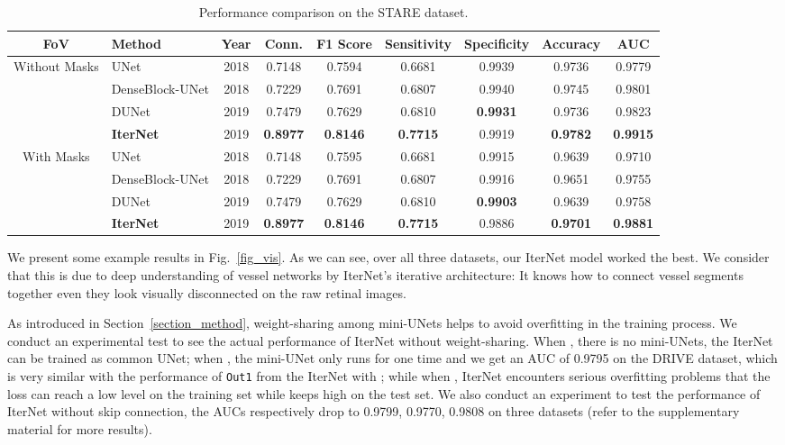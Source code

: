 \documentclass[10pt,twocolumn,letterpaper]{article}
\begin{document}
\begin{table*}[!t]
	\caption{Performance comparison on the STARE dataset.}
	\label{table_detect_performance_stare}
	\centering
	\begin{tabular}{cl|c|cccccc}
		\hline
		FoV &Method & Year & Conn. & F1 Score & Sensitivity & Specificity & Accuracy & AUC\\ 
		\hline					
		
		\multirow{4}{*}{Without Masks} &UNet  & 2018& 0.7148 &0.7594&   0.6681& 0.9939 & 0.9736 & 0.9779\\
		&DenseBlock-UNet& 2018& 0.7229 & 0.7691 &0.6807& 0.9940& 0.9745 &0.9801\\
		&DUNet &2019& 0.7479 &0.7629&  0.6810 & \textbf{0.9931} &  0.9736& 0.9823\\
		&\textbf{IterNet} & 2019&\textbf{0.8977}&  \textbf{0.8146} &  \textbf{0.7715} & 0.9919 & \textbf{0.9782}& \textbf{0.9915}\\
		
		\hline
		
		\multirow{4}{*}{With Masks}&UNet & 2018& 0.7148 &0.7595&   0.6681& 0.9915 & 0.9639 & 0.9710\\		
		&DenseBlock-UNet& 2018& 0.7229 & 0.7691 &0.6807& 0.9916& 0.9651 &0.9755\\
		&DUNet &2019& 0.7479 &0.7629&  0.6810 & \textbf{0.9903} &  0.9639& 0.9758\\		
		&\textbf{IterNet} & 2019&\textbf{0.8977}&  \textbf{0.8146} &  \textbf{0.7715} & 0.9886 & \textbf{0.9701}& \textbf{0.9881}\\
		\hline
	\end{tabular}
\end{table*}


We present some example results in Fig.~\ref{fig_vis}. As we can see, over all three datasets, our IterNet model worked the best. We consider that this is due to deep understanding of vessel networks by IterNet's iterative architecture: It knows how to connect vessel segments together even they look visually disconnected on the raw retinal images.

As introduced in Section~\ref{section_method}, weight-sharing among mini-UNets helps to avoid overfitting in the training process. We conduct an experimental test to see the actual performance of IterNet without weight-sharing. When , there is no mini-UNets, the IterNet can be trained as common UNet; when , the mini-UNet only runs for one time and we get an AUC of 0.9795 on the DRIVE dataset, which is very similar with the performance of \texttt{Out1} from the IterNet with ; while when , IterNet encounters serious overfitting problems that the loss can reach a low level on the training set while keeps high on the test set. 
We also conduct an experiment to test the performance of IterNet without skip connection, the AUCs respectively drop to 0.9799, 0.9770, 0.9808 on three datasets (refer to the supplementary material for more results).
\end{document}
